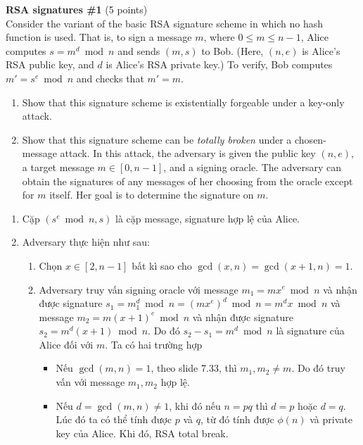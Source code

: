 \begin{problem}{\bf RSA signatures \#1} (5 points)\\
Consider the variant of the basic RSA signature scheme in which no hash
function is used. That is, to sign a message $m$, where
$0 \leq m \leq n-1$, Alice computes $s = m^d \bmod{n}$ and
sends $(m,s)$ to Bob. (Here, $(n,e)$ is Alice's RSA public key,
and $d$ is Alice's RSA private key.) To verify, Bob computes
$m'=s^e \bmod n$ and checks that $m'=m$.
\begin{enumerate}[label=(\alph*)]
\item Show that this signature scheme is existentially forgeable
      under a key-only attack.
\item Show that this signature scheme can be \emph{totally broken}
      under a chosen-message attack. In this attack, the adversary is
      given the public key $(n,e)$, a target message $m \in [0,n-1]$,
      and a signing oracle. The adversary can obtain the signatures
      of any messages of her choosing from the oracle except for $m$
      itself. Her goal is to determine the signature on $m$.
\end{enumerate}
\end{problem}

\begin{loigiai}
\begin{enumerate}[label=(\alph*)]
\item Cặp $(s^e \bmod n, s)$ là cặp message, signature hợp lệ của Alice.
\item Adversary thực hiện như sau: \begin{enumerate}[label=\roman*.]
\item Chọn $x \in [2, n - 1]$ bất kì sao cho $\gcd(x, n) = \gcd(x + 1, n)= 1$.
\item Adversary truy vấn signing oracle với message $m_1 = mx^e \bmod n$ và nhận được signature $s_1 = m_1^d \bmod n =
(mx^e)^d\bmod n = m^dx \bmod n$ và message $m_2 = m(x+1)^e\bmod n$ và nhận được signature $s_2 = m^d(x + 1)\bmod n$. Do
đó $s_2 - s_1 = m^d\bmod n$ là signature của Alice đối với $m$. Ta có hai trường hợp \begin{itemize}
\item Nếu $\gcd(m, n) = 1$, theo slide 7.33, thì $m_1, m_2\ne m$. Do đó truy vấn với message $m_1, m_2$ hợp lệ.
\item Nếu $d = \gcd(m, n) \ne 1$, khi đó nếu $n = pq$ thì $d = p$ hoặc $d = q$. Lúc đó ta có thể tính được $p$ và $q$,
từ đó tính được $\phi(n)$ và private key của Alice. Khi đó, RSA total break.
\end{itemize}
\end{enumerate}
\end{enumerate}
\end{loigiai}
